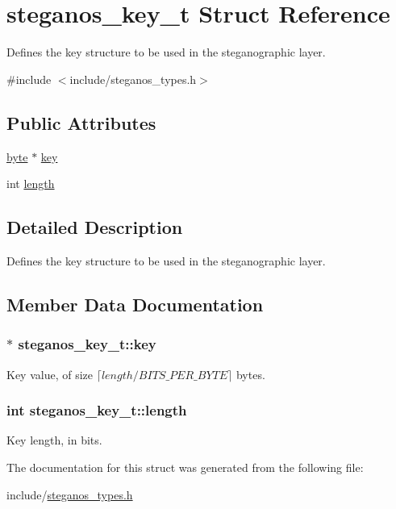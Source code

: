 \hypertarget{structsteganos__key__t}{
\section{steganos\_\-key\_\-t Struct Reference}
\label{structsteganos__key__t}
}


Defines the key structure to be used in the steganographic layer.  


{\ttfamily \#include $<$include/steganos\_\-types.h$>$}\subsection*{Public Attributes}
\begin{DoxyCompactItemize}
\item 
\hyperlink{global__types_8h_a0c8186d9b9b7880309c27230bbb5e69d}{byte} $\ast$ \hyperlink{structsteganos__key__t_ac0f0f913a2d6941b2e29b0366a949c6f}{key}
\item 
int \hyperlink{structsteganos__key__t_a4b7ed917b7244ee32b9fa182178ec786}{length}
\end{DoxyCompactItemize}


\subsection{Detailed Description}
Defines the key structure to be used in the steganographic layer. 

\subsection{Member Data Documentation}
\hypertarget{structsteganos__key__t_ac0f0f913a2d6941b2e29b0366a949c6f}{
\subsubsection[{key}]{$\ast$ {\bf steganos\_\-key\_\-t::key}}}
\label{structsteganos__key__t_ac0f0f913a2d6941b2e29b0366a949c6f}
Key value, of size $ \lceil length/BITS\_PER\_BYTE \rceil$ bytes. \hypertarget{structsteganos__key__t_a4b7ed917b7244ee32b9fa182178ec786}{
\subsubsection[{length}]{\setlength{\rightskip}{0pt plus 5cm}int {\bf steganos\_\-key\_\-t::length}}}
\label{structsteganos__key__t_a4b7ed917b7244ee32b9fa182178ec786}
Key length, in bits. 

The documentation for this struct was generated from the following file:\begin{DoxyCompactItemize}
\item 
include/\hyperlink{steganos__types_8h}{steganos\_\-types.h}\end{DoxyCompactItemize}
